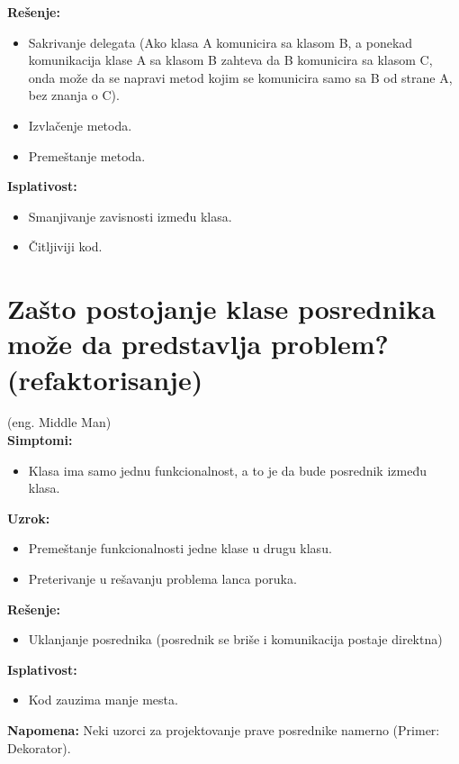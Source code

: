 \documentclass[a4paper]{article}
\begin{document}
  \noindent \textbf{Rešenje:} 
  \begin{itemize}
    \item Sakrivanje delegata (Ako klasa A komunicira sa klasom B, a ponekad komunikacija
          klase A sa klasom B zahteva da B komunicira sa klasom C, onda može 
          da se napravi metod kojim se komunicira samo sa B od strane A, bez znanja o C).
    \item Izvlačenje metoda.
    \item Premeštanje metoda.
  \end{itemize}

  \noindent \textbf{Isplativost:} 
  \begin{itemize}
    \item Smanjivanje zavisnosti između klasa.
    \item Čitljiviji kod.
  \end{itemize}

\section{Zašto postojanje klase posrednika može da predstavlja problem? (refaktorisanje)}
  (eng. Middle Man)\\
  \textbf{Simptomi:}
  \begin{itemize}
    \item Klasa ima samo jednu funkcionalnost, a to je da bude posrednik između klasa.
  \end{itemize}

  \noindent \textbf{Uzrok:} 
  \begin{itemize}
    \item Premeštanje funkcionalnosti jedne klase u drugu klasu.
    \item Preterivanje u rešavanju problema lanca poruka.
  \end{itemize}

  \noindent \textbf{Rešenje:} 
  \begin{itemize}
    \item Uklanjanje posrednika (posrednik se briše i komunikacija postaje direktna)
  \end{itemize}

  \noindent \textbf{Isplativost:} 
  \begin{itemize}
    \item Kod zauzima manje mesta.
  \end{itemize}  
  \textbf{Napomena:} Neki uzorci za projektovanje prave posrednike namerno (Primer: Dekorator).
\end{document}
